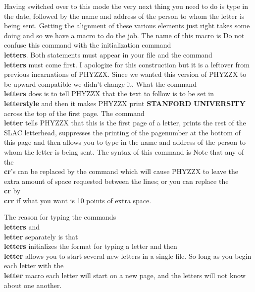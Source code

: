 Having switched over to this mode the very next thing you need to do
is type in the date, followed by the name and address
of the person to whom the letter is being sent.
Getting the alignment of these various elements just right
takes some doing and so we have a macro to do the job.
The name of this macro is
Do not confuse this command with the initialization
command {\bf \\letters}.
Both statements must appear in your file and the command {\bf \\letters}
must come first.
I apologize for this construction but it is a leftover from
previous incarnations of PHYZZX.
Since we wanted this version of PHYZZX to be upward compatible we didn't
change it.
What the command {\bf \\letters} does is to tell PHYZZX that the
text to follow is to be set in {\bf \\letterstyle} and then
it makes PHYZZX print {\bf STANFORD UNIVERSITY} across the top of the
first page.
The command {\bf \\letter} tells PHYZZX that this is the first page
of a letter, prints the rest of the SLAC letterhead,
suppresses the printing of the pagenumber at the
bottom of this page and then allows you to type in the
name and address of the person to whom the letter is being sent.
The syntax of this command is
Note that any of the {\bf \\cr}'s can be replaced by the command
which will cause PHYZZX to leave the extra amount of space requested
between the lines; or you can replace the {\bf \\cr} by {\bf \\crr}
if what you want is 10 points of extra space.
 
The reason for typing the commands {\bf \\letters} and {\bf \\letter}
separately is that {\bf \\letters} initializes the format for typing
a letter and then {\bf \\letter} allows you to start several new letters
in a single file.
So long as you begin each letter with the {\bf \\letter} macro
each letter will start on a new page, and the letters will not know
about one another.
 
